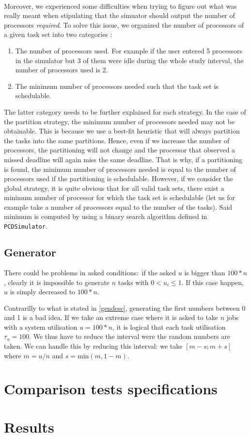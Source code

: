 \documentclass[a4paper]{article}
\begin{document}
\paragraph{}
Moreover, we experienced some difficulties when trying to figure out what was really meant when stipulating that the simuator should output the number of processors \textit{required}. 
To solve this issue, we organized the number of processors of a given task set into two categories :
\begin{enumerate}
\item The number of processors used. For example if the user entered 5 processors in the simulator but 3 of them were idle during the whole study interval, the number of processors used is 2.
\item The minimum number of processors needed such that the task set is schedulable. 
\end{enumerate}
The latter category needs to be further explained for each strategy. In the case of the partition strategy, the minimum number of processors needed may not be obtainable. This is because we use a best-fit heuristic that will always partition the tasks into the same partitions. Hence, even if we increase the number of processors, the partitioning will not change and the processor that observed a missed deadline will again miss the same deadline. That is why, if a partitioning is found, the minimum number of processors needed is equal to the number of processors used if the partitioning is schedulable.
However, if we consider the global strategy, it is quite obvious that for all valid task sets, there exist a minimum number of processor for which the task set is schedulable (let us for example take a number of processors equal to the number of the tasks). Said minimum is computed by using a binary search algorithm defined in \texttt{PCDSimulator}.

\subsection{Generator}
There could be problems in asked conditions: if the asked $u$ is bigger than $100 * n$, clearly it is impossible to generate $n$ tasks with $0 < u_i \leq 1$. If this case happen, $u$ is simply decreased to $100 * n$.

Contrarilly to what is stated in \ref{gendesc}, generating the first numbers between 0 and 1 is a bad idea.
If we take an extreme case where it is asked to take $n$ jobs with a system utilisation $u = 100 * n$, it is logical that each task utilisation $\tau_u = 100$.
We thus have to reduce the interval were the random numbers are taken.
We can handle this by reducing this interval: we take $[m - s; m + s]$ where $m = u / n$ and $s = \text{min}(m, 1-m)$.

\section{Comparison tests specifications}

\section{Results}
\end{document}
